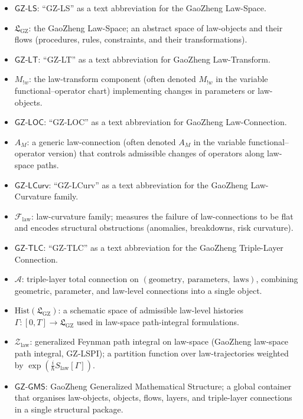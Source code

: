 \documentclass[11pt]{book}
\theoremstyle{plain}
\theoremstyle{definition}
\newcommand{\GZLStxt}{\textsf{GZ-LS}}   \newcommand{\GZLTtxt}{\textsf{GZ-LT}}   \newcommand{\GZLOCtxt}{\textsf{GZ-LOC}} \newcommand{\GZLCurvtxt}{\textsf{GZ-LCurv}}
\newcommand{\GZLS}{\ensuremath{\mathfrak{L}_{\mathrm{GZ}}}}       \newcommand{\GZLT}{\ensuremath{M_{!w}}}                           \newcommand{\GZLOC}{\ensuremath{A_M}}                             \newcommand{\GZLCurv}{\ensuremath{\mathcal{F}_{\mathrm{law}}}}
\newcommand{\GZTLCtxt}{\textsf{GZ-TLC}}                           \newcommand{\GZTLC}{\ensuremath{\mathcal{A}}}                     \newcommand{\GZGMS}{\textsf{GZ-GMS}}
\begin{document}
\begin{itemize}
  \item $\GZLStxt$:
        “GZ-LS” as a text abbreviation for the GaoZheng Law-Space.
\item $\GZLS$:
        the GaoZheng Law-Space; an abstract space of law-objects and
        their flows (procedures, rules, constraints, and their
        transformations).
\item $\GZLTtxt$:
        “GZ-LT” as a text abbreviation for GaoZheng Law-Transform.
\item $\GZLT$:
        the law-transform component (often denoted $M_{!w}$ in the
        variable functional–operator chart) implementing changes in
        parameters or law-objects.
\item $\GZLOCtxt$:
        “GZ-LOC” as a text abbreviation for GaoZheng Law-Connection.
\item $\GZLOC$:
        a generic law-connection (often denoted $A_M$ in the
        variable functional–operator version) that controls admissible
        changes of operators along law-space paths.
\item $\GZLCurvtxt$:
        “GZ-LCurv” as a text abbreviation for the GaoZheng
        Law-Curvature family.
\item $\GZLCurv$:
        law-curvature family; measures the failure of law-connections
        to be flat and encodes structural obstructions (anomalies,
        breakdowns, risk curvature).
\item $\GZTLCtxt$:
        “GZ-TLC” as a text abbreviation for the GaoZheng Triple-Layer
        Connection.
\item $\GZTLC$:
        triple-layer total connection on $(\text{geometry},\ \text{parameters},\ \text{laws})$,
        combining geometric, parameter, and law-level connections into
        a single object.
\item $\mathrm{Hist}(\GZLS)$:
        a schematic space of admissible law-level histories
        $\Gamma:[0,T]\to\GZLS$ used in law-space path-integral
        formulations.
\item $\mathcal{Z}_{\mathrm{law}}$:
        generalized Feynman path integral on law-space (GaoZheng
        law-space path integral, GZ-LSPI); a partition function over
        law-trajectories weighted by
        $\exp(\tfrac{i}{\hbar}S_{\mathrm{law}}[\Gamma])$.
\item $\GZGMS$:
        GaoZheng Generalized Mathematical Structure; a global
        container that organises law-objects, objects, flows, layers,
        and triple-layer connections in a single structural package.
\end{itemize}
\end{document}
